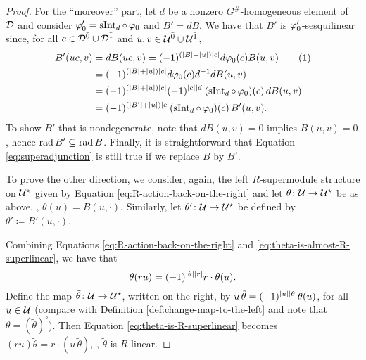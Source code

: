 \documentclass{amsbook}
\begin{document}
\begin{proof}
    For the ``moreover'' part, let $d$ be a nonzero $G^\#$-homogeneous element of $\mathcal{D}$ and consider $\varphi_0' = \operatorname{sInt}_d \circ \, \varphi_0$ and $B' = dB$. 
    We have that $B'$ is $\varphi_0'$-sesquilinear since, for all $c\in \mathcal{D}^{\bar0} \cup \mathcal{D}^{\bar1}$ and $u,v \in \mathcal U^{\bar0} \cup \mathcal U^{\bar1}$,
    \begin{align*}
        B' (uc, v) &= dB (uc, v) = (-1)^{(|B| + |u| ) |c|} d\vphi_0(c) B(u,v) \addtocounter{equation}{1}\tag{\theequation}\label{eq:dB-is-sesquilinear}\\
        &= (-1)^{(|B| + |u| ) |c|} d\vphi_0(c) d\inv d B(u,v) \\
        &=  (-1)^{(|B| + |u| ) |c|} \sign{c}{d} (\operatorname{sInt}_d \circ\, \vphi_0) (c)\, dB(u,v)\\
        &= (-1)^{(|B'| + |u|) |c|} (\operatorname{sInt}_d \circ\, \vphi_0) (c)\, B'(u,v).
    \end{align*}
    To show $B'$ that is nondegenerate, note that $dB(u,v) = 0$ implies $B(u,v) =0$, hence  $\operatorname{rad} B' \subseteq \operatorname{rad} B$. 
    Finally, it is straightforward that Equation \eqref{eq:superadjunction} is still true if we replace $B$ by $B'$. 
    
    
    To prove the other direction, we consider, again, the left $R$-supermodule structure on $\mathcal U^\star$ given by Equation \eqref{eq:R-action-back-on-the-right} and let $\theta\colon \mathcal U \to \mathcal U^\star$ be as above, \ie, $\theta(u) = B(u, \cdot)$. Similarly, let $\theta'\colon \mathcal U \to \mathcal U^\star$ be defined by $\theta' \coloneqq B'(u, \cdot)$.
    
    Combining Equations \eqref{eq:R-action-back-on-the-right} and  \eqref{eq:theta-is-almost-R-superlinear}, we have that
    \begin{equation}\label{eq:theta-is-R-superlinear}
        \theta(ru) = (-1)^{|\theta||r|} r\cdot \theta(u).
    \end{equation}
    Define the map $\tilde \theta\colon \mathcal U \to \mathcal U^\star$, written on the right, by $u\, \tilde\theta = (-1)^{|u||\theta|} \theta(u)$, for all $u\in \mathcal U$ (compare with Definition \ref{def:change-map-to-the-left} and note that $\theta = (\tilde \theta)^\circ$). 
    Then Equation \eqref{eq:theta-is-R-superlinear} becomes $(ru)\tilde\theta = r \cdot (u\,\tilde\theta)$, \ie, $\tilde\theta$ is $R$-linear.
    

\end{proof}
\end{document}
